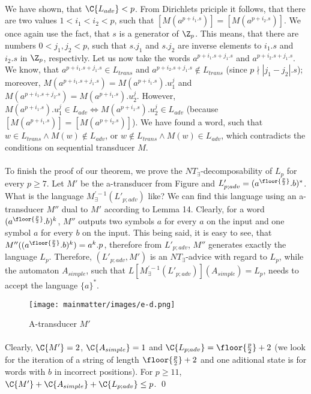 \paragraph{}
We have shown, that $\C{L_{adv}} < p$. From Dirichlets priciple it follows, that there are two values $1 < i_1 < i_2 < p$, such that $[M(a^{p+i_1.s})] = [M(a^{p+i_2.s})]$. We once again use the fact, that $s$ is a generator of $\Z_p$. This means, that there are numbers $0< j_1, j_2 < p$, such that $s.j_1$ and $s.j_2$ are inverse elements to $i_1.s$ and $i_2.s$ in $\Z_p$, respectivly. Let us now take the words $a^{p+i_1.s+j_1.s}$ and $a^{p+i_2.s+j_1.s}$. We know, that $a^{p+i_1.s+j_1.s} \in L_{trans}$ and $a^{p+i_2.s+j_1.s} \notin L_{trans}$ (since $p \nmid |j_1 - j_2|.s$); moreover, $M(a^{p+i_1.s + j_1.s}) = M(a^{p+i_1.s}).u^j_1$ and $M(a^{p+i_1.s + j_2.s}) = M(a^{p+i_1.s}).u^j_2$. However, $M(a^{p+i_1.s}).u^j_1 \in L_{adv} \Leftrightarrow M(a^{p+i_1.s}).u^j_2 \in L_{adv}$ (because $[M(a^{p+i_1.s})] = [M(a^{p+i_2.s})]$). We have found a word, such that $w \in L_{trans} \wedge M(w) \notin L_{adv}$, or $w \notin L_{trans} \wedge M(w) \in L_{adv}$, which contradicts the conditions on sequential transducer $M$. 

\paragraph{}
To finish the proof of our theorem, we prove the $NT_{\exists}$-decomposability of $L_p$ for every $p \geq 7$. Let $M'$ be the a-transducer from Figure and $L'_{p;adv} = (a^{\floor{\frac{p}{2}}}.b)^*$. What is the language $M_{\exists}^{'-1}(L'_{p;adv})$ like? We can find this language using an a-transducer $M''$ dual to $M'$ according to Lemma 14. Clearly, for a word $(a^{\floor{\frac{p}{2}}}.b)^k$, $M''$ outputs two symbols $a$ for every $a$ on the input and one symbol $a$ for every $b$ on the input. This being said, it is easy to see, that $M''((a^{\floor{\frac{p}{2}}}.b)^k) = a^k.p$, therefore from $L'_{p;adv}$, $M''$ generates exactly the language $L_p$. Therefore, $(L'_{p;adv},M')$ is an $NT_{\exists}$-advice with regard to $L_p$, while the automaton $A_{simple}$, such that $L[M_{\exists}^{'-1}(L'_{p;adv})](A_{simple}) = L_p$, needs to accept the language $\{a\}^*$.

\begin{figure}[h!]
\centering
\texttt{[image: mainmatter/images/e-d.png]}
\caption{A-transducer $M'$}
\end{figure}

\paragraph{}
Clearly, $\C{M'} = 2$, $\C{A_{simple}} = 1$ and $\C{L_{p;adv}} = \floor{\frac{p}{2}} + 2$ (we look for the iteration of a string of length $\floor{\frac{p}{2}} + 2$ and one aditional state is for words with $b$ in incorrect positions). For $p \geq 11$, $\C{M'} + \C{A_{simple}} + \C{L_{p;adv}} \leq p$. \qed

